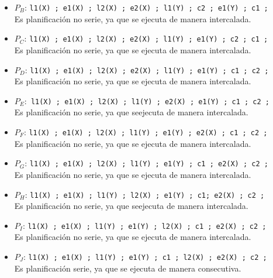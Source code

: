 \begin{enumerate}
\begin{itemize}
\item $P_B$: \texttt{l1(X) ; e1(X) ; l2(X) ; e2(X) ; l1(Y) ; c2 ; e1(Y) ; c1 ;} \\ Es planificación no serie, ya que se ejecuta de manera intercalada.

\item $P_C$: \texttt{l1(X) ; e1(X) ; l2(X) ; e2(X) ; l1(Y) ; e1(Y) ; c2 ; c1 ;} \\ Es planificación no serie, ya que se ejecuta de manera intercalada.

\item $P_D$: \texttt{l1(X) ; e1(X) ; l2(X) ; e2(X) ; l1(Y) ; e1(Y) ; c1 ; c2 ;} \\ Es planificación no serie, ya que se ejecuta de manera intercalada.

\item $P_E$:\texttt{ l1(X) ; e1(X) ; l2(X) ; l1(Y) ; e2(X) ; e1(Y) ; c1 ; c2 ;} \\ Es planificación no serie, ya que seejecuta de manera intercalada.

\item $P_F$: \texttt{l1(X) ; e1(X) ; l2(X) ; l1(Y) ; e1(Y) ; e2(X) ; c1 ; c2 ;} \\ Es planificación no serie, ya que se ejecuta de manera intercalada.

\item $P_G$: \texttt{l1(X) ; e1(X) ; l2(X) ; l1(Y) ; e1(Y) ; c1 ; e2(X) ; c2 ;} \\ Es planificación no serie, ya que se ejecuta de manera intercalada.

\item $P_H$: \texttt{l1(X) ; e1(X) ; l1(Y) ; l2(X) ; e1(Y) ; c1; e2(X) ; c2 ;} \\ Es planificación no serie, ya que seejecuta de manera intercalada.

\item $P_I$: \texttt{l1(X) ; e1(X) ; l1(Y) ; e1(Y) ; l2(X) ; c1 ; e2(X) ; c2 ;} \\ Es planificación no serie, ya que se ejecuta de manera intercalada.

\item $P_J$: \texttt{l1(X) ; e1(X) ; l1(Y) ; e1(Y) ; c1 ; l2(X) ; e2(X) ; c2 ;} \\ Es planificación serie, ya que se ejecuta de manera consecutiva.
\end{itemize}


\end{enumerate}
